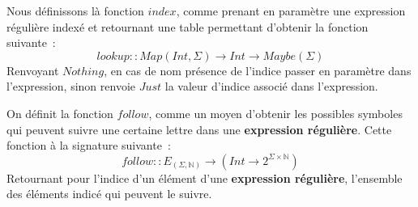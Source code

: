 \begin{Definition}
  Nous définissons là fonction \(index\), comme prenant en paramètre une 
  expression régulière indexé et retournant une table permettant d'obtenir la 
  fonction suivante~:
  \[
    lookup :: Map(Int, \Sigma) \to Int \to Maybe(\Sigma) 
  \]
  Renvoyant \(Nothing\), en cas de nom présence de l'indice passer en paramètre 
  dans l'expression, sinon renvoie \(Just\) la valeur d'indice associé dans 
  l'expression.
\end{Definition}

\begin{Definition}
  On définit la fonction \(follow\), comme un moyen d'obtenir les possibles 
  symboles qui peuvent suivre une certaine lettre dans une 
  \textbf{expression régulière}. Cette fonction à la signature suivante~:
  \[
    follow :: E_{(\Sigma, \mathbb{N})} \to (Int \to 2^{\Sigma \times \mathbb{N}})
  \]
  Retournant pour l'indice d'un élément d'une \textbf{expression régulière}, 
  l'ensemble des éléments indicé qui peuvent le suivre.
\end{Definition}